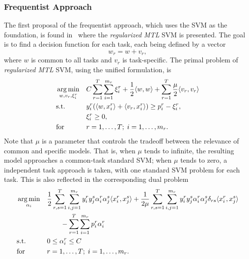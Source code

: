 \subsubsection*{Frequentist Approach}
The first proposal of the frequentist approach, which uses the SVM as the foundation, is found in~\cite{EvgeniouP04} where the \emph{regularized MTL} SVM is presented. The goal is to find a decision function for each task, each being defined by a vector
$$w_r = w + v_r,$$
where $w$ is common to all tasks and $v_r$ is task-specific.
The primal problem of \emph{regularized MTL} SVM, using the unified formulation, is 
\begin{equation}
    \label{eq:regmtlsvm_primal}
    \begin{aligned}
        & \argmin_{w, v_r, \xi_i^r}
        & & C \sum_{r=1}^\ntasks \sum_{i=1}^{\npertask_r} \xi_i^r + \frac{1}{2} \dotp{w}{w} + \sum_{r=1}^\ntasks \frac{\mu}{2} \dotp{v_r}{v_r} \\
        & \text{s.t.}
        & & y_{i}^r ( \dotp{w}{x_{i}^r} + \dotp{v_r}{x_{i}^r}) \geq p_i^r - \xi_i^r ,\\
        & & &\xi_i^r \geq 0, \\
        & \text{for } & & r=1, \ldots, \ntasks; \; i=1, \ldots, \npertask_r.
    \end{aligned}
\end{equation}
Note that $\mu$ is a parameter that controls the tradeoff between the relevance of common and specific models. That is, when $\mu$ tends to infinite, the resulting model approaches a common-task standard SVM; when $\mu$ tends to zero, a independent task approach is taken, with one standard SVM problem for each task.
This is also reflected in the corresponding dual problem
\begin{equation}\label{eq:regmtlsvm_dual}
    \begin{aligned}
        & \argmin_{\alpha_i} 
        & & \frac{1}{2} \sum_{r, s=1}^\ntasks \sum_{i, j=1}^{\npertask_r} y_i^r y_j^s \alpha_i^r \alpha_j^s \dotp{x_i^r}{x_j^s} + \frac{1}{2 \mu} \sum_{r, s=1}^\ntasks  \sum_{i, j=1}^{\npertask_r} y_i^r y_j^s \alpha_i^r \alpha_j^s \delta_{rs} \dotp{x_i^r}{x_j^s} \\
        & & & \qquad - \sum_{r=1}^\ntasks \sum_{i=1}^{\npertask_r} p_i^r \alpha_i^r \\
        & \text{s.t.}
        & & 0 \leq \alpha_i^r \leq C \\
        & \text{for } & & r=1, \ldots, \ntasks; \; i=1, \ldots, \npertask_r.
        \end{aligned}
\end{equation}
